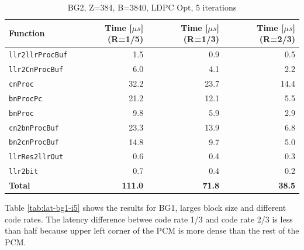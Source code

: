 \documentclass{article}
\begin{document}
\begin{table}[ht]
  \centering
  \begin{tabular}{lrrr}
    \toprule
    \textbf{Function} & \textbf{Time [$\mu s$] (R=1/5)} & \textbf{Time [$\mu s$] (R=1/3)} & \textbf{Time [$\mu s$] (R=2/3)}\\
    \midrule
    \texttt{llr2llrProcBuf} & 1.5  & 0.9  & 0.5  \\
    \texttt{llr2CnProcBuf}  & 6.0  & 4.1  & 2.2  \\
    \texttt{cnProc}         & 32.2 & 23.7 & 14.4 \\
    \texttt{bnProcPc}       & 21.2 & 12.1 & 5.5  \\
    \texttt{bnProc}         & 9.8  & 5.9  & 2.9  \\
    \texttt{cn2bnProcBuf}   & 23.3 & 13.9 & 6.8  \\
    \texttt{bn2cnProcBuf}   & 14.8 & 9.7  & 5.0  \\
    \texttt{llrRes2llrOut}  & 0.6  & 0.4  & 0.3  \\
    \texttt{llr2bit}        & 0.7  & 0.4  & 0.2  \\
    \midrule
    \textbf{Total}          & \textbf{111.0} & \textbf{71.8} & \textbf{38.5} \\
    \bottomrule
  \end{tabular}
  \caption{BG2, Z=384, B=3840, LDPC Opt, 5 iterations}
  \label{tab:lat-bg2-i5}
\end{table}

Table \ref{tab:lat-bg1-i5} shows the results for BG1, larges block size and different code rates. The latency difference betwee code rate 1/3 and code rate 2/3 is less than half because upper left corner of the PCM is more dense than the rest of the PCM.
\end{document}
